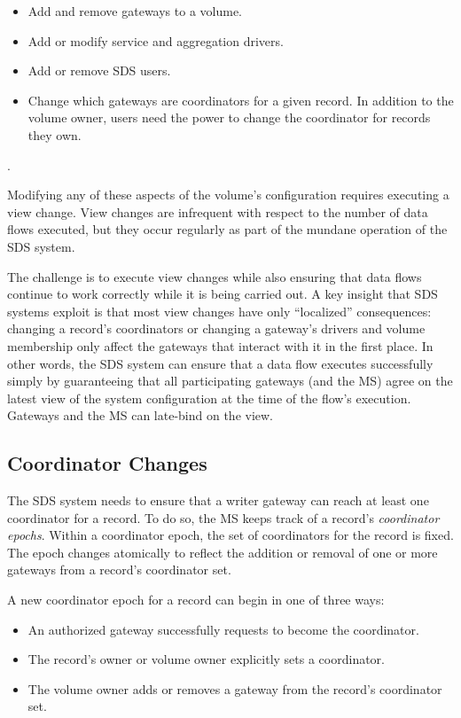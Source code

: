 \begin{itemize}
   \item Add and remove gateways to a volume.
   \item Add or modify service and aggregation drivers.
   \item Add or remove SDS users.
   \item Change which gateways are coordinators for a given record.  In addition
      to the volume owner, users need the power to change the coordinator for
      records they own.
\end{itemize}.

Modifying any of these aspects of the volume's configuration requires executing a
view change.  View changes are infrequent with respect to the number of data
flows executed, but they occur regularly as part of the mundane
operation of the SDS system.

The challenge is to execute view changes while also ensuring that data flows
continue to work correctly while it is being carried out.
A key insight that SDS systems exploit is that most view changes have only
``localized'' consequences:  changing a record's coordinators or changing
a gateway's drivers and volume membership only affect the gateways that interact
with it in the first place.  In other words, the SDS system can ensure that a
data flow executes successfully simply by guaranteeing that all participating
gateways (and the MS) agree on the latest view of the system configuration at the
time of the flow's execution.  Gateways and the MS can late-bind on the view.

\subsection{Coordinator Changes}

The SDS system needs to ensure that a writer gateway can reach at least one
coordinator for a record.  To do so, the MS keeps track of a record's
\emph{coordinator epochs}.  Within a coordinator epoch, the set of coordinators for the
record is fixed.  The epoch changes atomically to reflect the addition or removal of one
or more gateways from a record's coordinator set.

A new coordinator epoch for a record can begin in one of three ways:

\begin{itemize}
   \item An authorized gateway successfully requests to become the coordinator.
   \item The record's owner or volume owner explicitly sets a coordinator.
   \item The volume owner adds or removes a gateway from the record's coordinator
      set.
\end{itemize}


